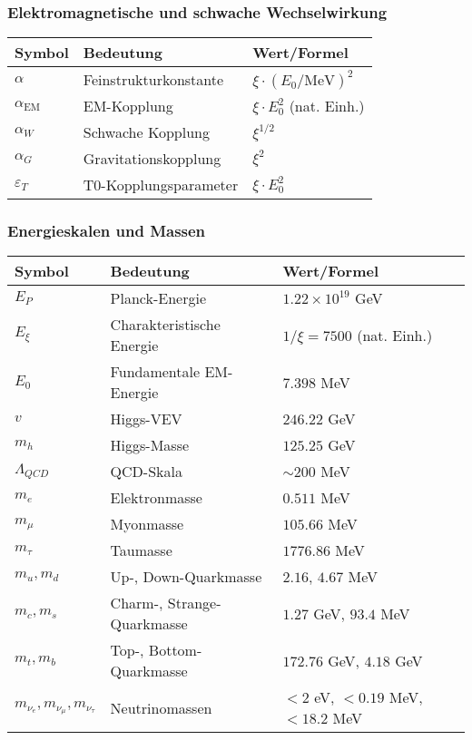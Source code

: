 \documentclass[12pt,a4paper]{article}
\begin{document}
	\subsubsection{Elektromagnetische und schwache Wechselwirkung}
	\begin{longtable}{lll}
		\toprule
		\textbf{Symbol} & \textbf{Bedeutung} & \textbf{Wert/Formel} \\
		\midrule
		$\alpha$ & Feinstrukturkonstante & $\xi \cdot (E_0/\text{MeV})^2$ \\
		$\alpha_{\text{EM}}$ & EM-Kopplung & $\xi \cdot E_0^2$ (nat. Einh.) \\
		$\alpha_W$ & Schwache Kopplung & $\xi^{1/2}$ \\
		$\alpha_G$ & Gravitationskopplung & $\xi^{2}$ \\
		$\varepsilon_T$ & T0-Kopplungsparameter & $\xi \cdot E_0^2$ \\
		\bottomrule
	\end{longtable}
	
	\subsubsection{Energieskalen und Massen}
	\begin{longtable}{lll}
		\toprule
		\textbf{Symbol} & \textbf{Bedeutung} & \textbf{Wert/Formel} \\
		\midrule
		$E_P$ & Planck-Energie & $1.22 \times 10^{19}$ GeV \\
		$E_\xi$ & Charakteristische Energie & $1/\xi = 7500$ (nat. Einh.) \\
		$E_0$ & Fundamentale EM-Energie & $7.398$ MeV \\
		$v$ & Higgs-VEV & $246.22$ GeV \\
		$m_h$ & Higgs-Masse & $125.25$ GeV \\
		$\Lambda_{QCD}$ & QCD-Skala & $\sim 200$ MeV \\
		$m_e$ & Elektronmasse & $0.511$ MeV \\
		$m_\mu$ & Myonmasse & $105.66$ MeV \\
		$m_\tau$ & Taumasse & $1776.86$ MeV \\
		$m_u, m_d$ & Up-, Down-Quarkmasse & $2.16$, $4.67$ MeV \\
		$m_c, m_s$ & Charm-, Strange-Quarkmasse & $1.27$ GeV, $93.4$ MeV \\
		$m_t, m_b$ & Top-, Bottom-Quarkmasse & $172.76$ GeV, $4.18$ GeV \\
		$m_{\nu_e}, m_{\nu_\mu}, m_{\nu_\tau}$ & Neutrinomassen & $< 2$ eV, $< 0.19$ MeV, $< 18.2$ MeV \\
		\bottomrule
	\end{longtable}
	
\end{document}
